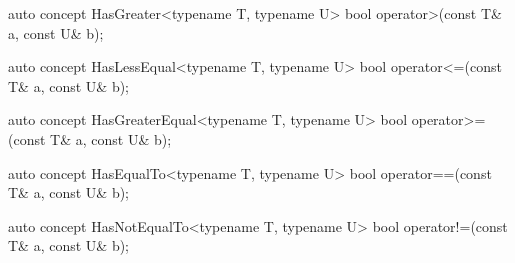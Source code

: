 \documentclass[american,twoside]{book}
\begin{document}
\begin{itemdecl}
auto concept HasGreater<typename T, typename U> {
  bool operator>(const T& a, const U& b);
}
\end{itemdecl}

\begin{itemdescr}
\pnum
{}
\end{itemdescr}

\begin{itemdecl}
auto concept HasLessEqual<typename T, typename U> {
  bool operator<=(const T& a, const U& b);
}
\end{itemdecl}

\begin{itemdescr}
\pnum
{}
\end{itemdescr}

\begin{itemdecl}
auto concept HasGreaterEqual<typename T, typename U> {
  bool operator>=(const T& a, const U& b);
}
\end{itemdecl}

\begin{itemdescr}
\pnum
{}
\end{itemdescr}

\pnum
{}

\begin{itemdecl}
auto concept HasEqualTo<typename T, typename U> {
  bool operator==(const T& a, const U& b);
}
\end{itemdecl}

\begin{itemdescr}
\pnum
{}
\end{itemdescr}

\begin{itemdecl}
auto concept HasNotEqualTo<typename T, typename U> {
  bool operator!=(const T& a, const U& b);
}
\end{itemdecl}
\end{document}
